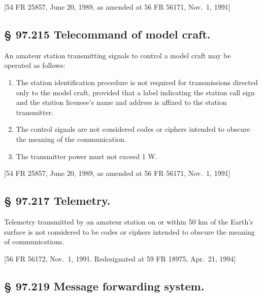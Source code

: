 \documentclass[
  letterpaper,
  DIV=11,
  numbers=noendperiod]{scrreport}
\begin{document}
{[}54 FR 25857, June 20, 1989, as amended at 56 FR 56171, Nov.~1,
1991{]}

\hypertarget{telecommand-of-model-craft.}{%
\subsection*{§ 97.215 Telecommand of model
craft.}\label{telecommand-of-model-craft.}}

An amateur station transmitting signals to control a model craft may be
operated as follows:

\begin{enumerate}
\def\labelenumi{(\alph{enumi})}
\item
  The station identification procedure is not required for transmissions
  directed only to the model craft, provided that a label indicating the
  station call sign and the station licensee's name and address is
  affixed to the station transmitter.
\item
  The control signals are not considered codes or ciphers intended to
  obscure the meaning of the communication.
\item
  The transmitter power must not exceed 1 W.
\end{enumerate}

{[}54 FR 25857, June 20, 1989, as amended at 56 FR 56171, Nov.~1,
1991{]}

\hypertarget{telemetry.}{%
\subsection*{§ 97.217 Telemetry.}\label{telemetry.}}

Telemetry transmitted by an amateur station on or within 50 km of the
Earth's surface is not considered to be codes or ciphers intended to
obscure the meaning of communications.

{[}56 FR 56172, Nov.~1, 1991. Redesignated at 59 FR 18975, Apr.~21,
1994{]}

\hypertarget{message-forwarding-system.}{%
\subsection*{§ 97.219 Message forwarding
system.}\label{message-forwarding-system.}}
\end{document}
